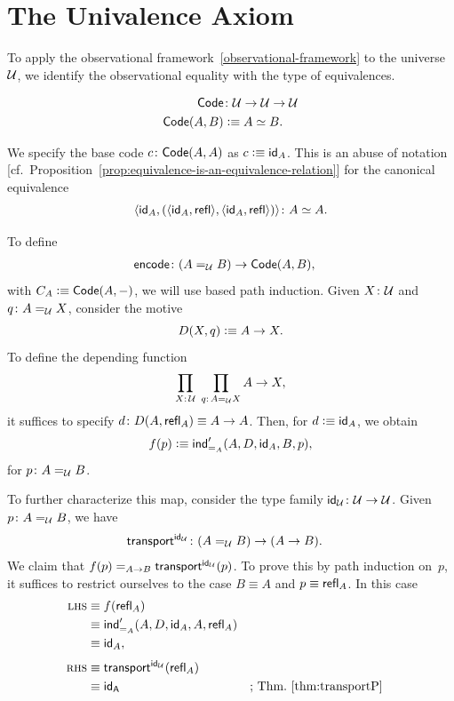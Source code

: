 \section{The Univalence Axiom}

To apply the observational framework~\ref{observational-framework} to the universe \/$\mathcal U$, we identify the observational equality with the type of equivalences.
\begin{description}[font=\normalfont\scshape]
    \item[Code family.]
    \begin{align*}
        \fun{Code}&\colon\univ\to\univ\to\univ\\
        \fun{Code}(A,B)&\defeq A\simeq B.
    \end{align*}
    
    \item[Base code.]
    We specify the base code \/$c \colon \fun{Code}(A,A)$ as \/$c \mathrel{\vcentcolon}\equiv \mathsf{id}_A$. This is an abuse of notation  [cf.~Proposition~\ref{prop:equivalence-is-an-equivalence-relation}] for the canonical equivalence
    \[
        \dep{\id_A,(\dep{\id_A,\fun{refl}},\dep{\id_A,\fun{refl}})}\colon A\simeq A.
    \]
   
    \item[Encode function.]
    To define
    \begin{align*}
        \fun{encode}&\colon(A\eq\univ B)\to\fun{Code}(A,B),
    \end{align*}
    with $C_A\mathrel{\vcentcolon}\equiv\mathsf{Code}(A,{\mathord-})$, we will use based path induction. Given $X\colon\univ$ and $q\colon A\eq\univ X$, consider the motive
    \[
        D(X,q)\mathrel{\vcentcolon}\equiv A\to X.
    \]
    To define the depending function
    \[
        \prod_{X\colon\univ}\;\prod_{q\colon A\eq\univ X}A\to X,
    \]
    it suffices to specify $d\colon D(A,\fun{refl}_A)\equiv A\to A$. Then, for $d\mathrel{\vcentcolon}\equiv\mathsf{id}_A$, we obtain
    \[
        f(p)\mathrel{\vcentcolon}\equiv\mathsf{ind}'_{\mathrel{=_{A}}}(A,D,\mathsf{id}_A,B,p),
    \]
    for $p\colon A\eq\univ B$.
    
    To further characterize this map, consider the type family $\id_\univ\colon\univ\to\univ$. Given $p\colon A\eq\univ B$, we have
    \begin{align*}
        \fun{transport}^{\id_\univ}&\colon(A\eq\univ B)
            \to(A\to B).
    \end{align*}
    We claim that $f(p)\mathrel{=_{A\to B}}\mathsf{transport}^{\mathsf{id}_\mathcal U}(p)$. To prove this by path induction on~$p$, it suffices to restrict ourselves to the case $B\equiv A$ and $p\equiv\mathsf{refl}_A$. In this case
    \begin{align*}
        \textsc{lhs}&\equiv f(\mathsf{refl}_A)\\
            &\equiv\mathsf{ind}'_{\mathrel{=_{A}}}(A,D,\mathsf{id}_A,A,\mathsf{refl}_A)\\
            &\equiv\mathsf{id}_A,\\[1mm]
        \textsc{rhs}&\equiv\mathsf{transport}^{\mathsf{id}_\mathcal U}(\mathsf{refl}_A)\\
            &\equiv\mathsf{\mathsf{id}_A}
            &&\text{; Thm.~\ref{thm:transportP}}
    \end{align*}
    

\end{description}
